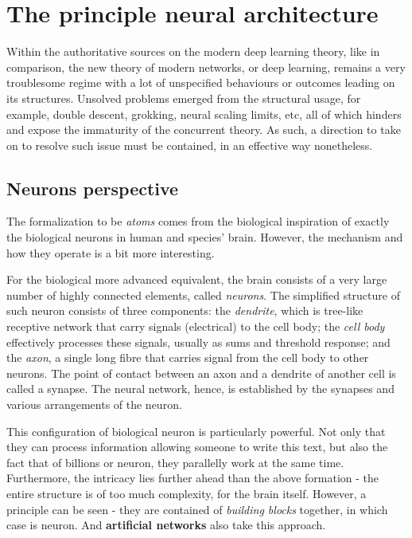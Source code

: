 \chapter{The principle neural architecture}

Within the authoritative sources on the modern deep learning theory, like \cite{neyshabur2015norm,neyshabur2017exploring,jacot2018ntk,arora2019finegrained,lee2019wide,chizat2019lazy,zou2019implicit,bartlett2021deep,roberts2022principles,wei2022theory,yang2019scaling} in comparison, the new theory of modern networks, or deep learning, remains a very troublesome regime with a lot of unspecified behaviours or outcomes leading on its structures. Unsolved problems emerged from the structural usage, for example, double descent, grokking, neural scaling limits, etc, all of which hinders and expose the immaturity of the concurrent theory. As such, a direction to take on to resolve such issue must be contained, in an effective way nonetheless. 

\section{Neurons perspective}

The formalization to be \textit{atoms} comes from the biological inspiration of exactly the biological neurons in human and species' brain. However, the mechanism and how they operate is a bit more interesting. 

For the biological more advanced equivalent, the brain consists of a very large number of highly connected elements, called \textit{neurons}. The simplified structure of such neuron consists of three components: the \textit{dendrite}, which is tree-like receptive network that carry signals (electrical) to the cell body; the \textit{cell body} effectively processes these signals, usually as sums and threshold response; and the \textit{axon}, a single long fibre that carries signal from the cell body to other neurons. The point of contact between an axon and a dendrite of another cell is called a synapse. The neural network, hence, is established by the synapses and various arrangements of the neuron. 

This configuration of biological neuron is particularly powerful. Not only that they can process information allowing someone to write this text, but also the fact that of billions or neuron, they parallelly work at the same time. Furthermore, the intricacy lies further ahead than the above formation - the entire structure is of too much complexity, for the brain itself. However, a principle can be seen - they are contained of \textit{building blocks} together, in which case is neuron. And \textbf{artificial networks} also take this approach. 

